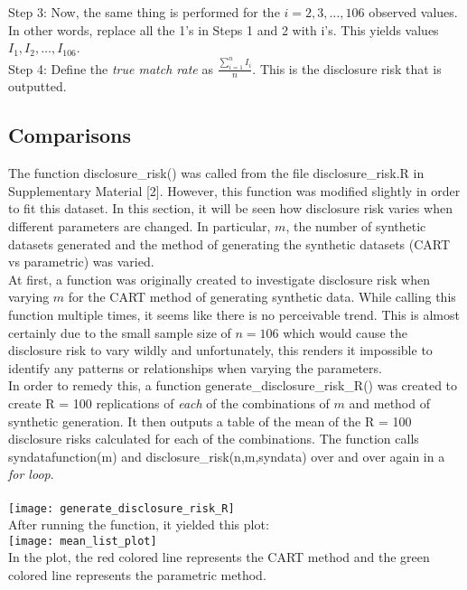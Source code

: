 \documentclass[12pt]{article}
\begin{document}
Step 3: Now, the same thing is performed for the $i=2,3, \dots, 106$ observed values. In other words, replace all the 1’s in Steps 1 and 2 with i’s. This yields values $I_1, I_2, \dots, I_{106}$. \\

Step 4: Define the \textit{true match rate} as $\frac{\sum_{i=1}^{n} I_i}{n}$. This is the disclosure risk that is outputted.\\

\subsection*{Comparisons}
The function disclosure\_risk() was called from the file disclosure\_risk.R in Supplementary Material [2]. However, this function was modified slightly in order to fit this dataset. In this section, it will be seen how disclosure risk varies when different parameters are changed. In particular, $m$, the number of synthetic datasets generated and the method of generating the synthetic datasets (CART vs parametric) was varied. \\
At first, a function was originally created to investigate disclosure risk when varying $m$ for the CART method of generating synthetic data. While calling this function multiple times, it seems like there is no perceivable trend. This is almost certainly due to the small sample size of $n=106$ which would cause the disclosure risk to vary wildly and unfortunately, this renders it impossible to identify any patterns or relationships when varying the parameters.\\

In order to remedy this, a function generate\_disclosure\_risk\_R() was created to create R = 100 replications of \textit{each} of the combinations of $m$ and method of synthetic generation. It then outputs a table of the mean of the R = 100 disclosure risks calculated for each of the combinations. The function calls syndatafunction(m) and disclosure\_risk(n,m,syndata) over and over again in a \textit{for loop}.\\\\
\texttt{[image: generate\_disclosure\_risk\_R]}\\

After running the function, it yielded this plot: \\

\texttt{[image: mean\_list\_plot]}\\
In the plot, the red colored line represents the CART method and the green colored line represents the parametric method.
\end{document}
